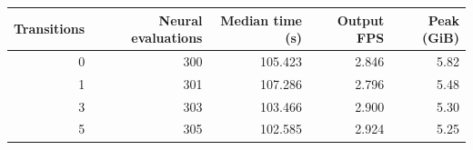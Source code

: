 \begin{tabular}{rrrrr}
  \toprule
  Transitions & Neural evaluations & Median time (s) & Output FPS & Peak (GiB) \\
  \midrule
  0 & 300 & 105.423 & 2.846 & 5.82 \\
  1 & 301 & 107.286 & 2.796 & 5.48 \\
  3 & 303 & 103.466 & 2.900 & 5.30 \\
  5 & 305 & 102.585 & 2.924 & 5.25 \\
  \bottomrule
\end{tabular}

